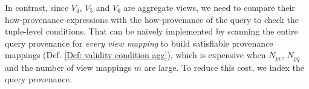 \begin{example}





In contrast, since $V_4$, $V_5$ and $V_6$ are aggregate views, we need to compare their how-provenance expressions with the how-provenance of the query to check the {tuple-level conditions}. That can be naively implemented by scanning the entire query provenance for {\em every view mapping} to build satisfiable provenance mappings (Def. \ref{Def: validity condition agg}), which is expensive when $N_{pv}$, $N_{pq}$ and the number of view mappings $m$ are large.  To reduce this cost, we index the query provenance.


\end{example}
